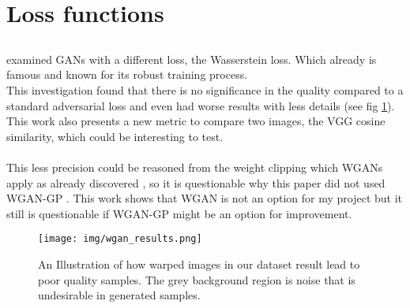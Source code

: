 		
	
	\newpage
	\section{Loss functions}
	\label{sec:lit-loss}
		
		\subsection{}
			\citeauthor{noah_makow_wasserstein_2018} examined GANs with a different loss, the Wasserstein loss. Which already is famous and known for its robust training process.\\
			This investigation found that there is no significance in the quality compared to a standard adversarial loss and even had worse results with less details (see fig \ref{fig:wgan_vs_gan}).\\
			This work also presents a new metric to compare two images, the VGG cosine similarity, which could be interesting to test.\\
			\\
			This less precision could be reasoned from the weight clipping which WGANs apply as already discovered \cite{gulrajani_improved_2017}, so it is questionable why this paper did not used WGAN-GP \cite{gulrajani_improved_2017}. This work shows that WGAN is not an option for my project but it still is questionable if WGAN-GP might be an option for improvement.
			\begin{figure}[H]
				\centering
				\texttt{[image: img/wgan\_results.png]}
				\caption[Results of using WGAN]{An Illustration of how warped images in our dataset result lead to poor quality samples. The grey background region is noise that is undesirable in generated samples.}
				\label{fig:wgan_vs_gan}
			\end{figure}
			\FloatBarrier
			
